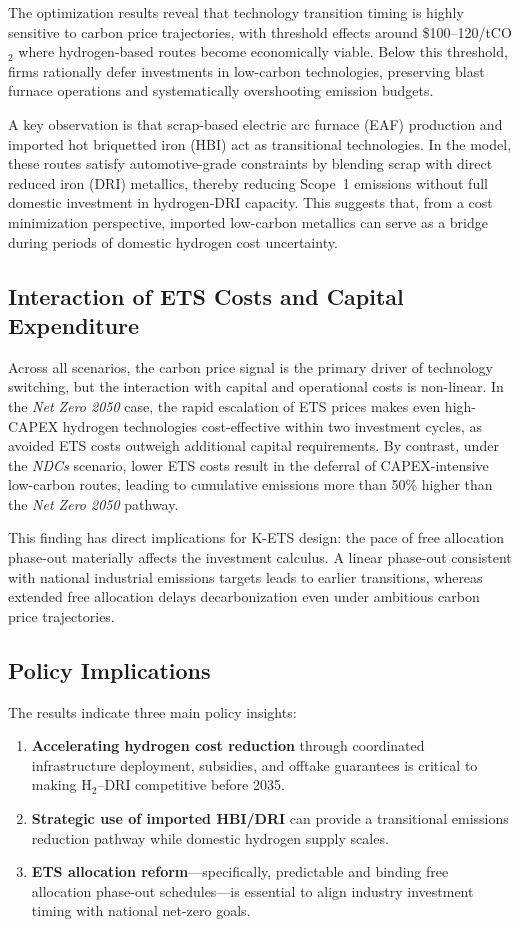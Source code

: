 \documentclass[preprint,5p,authoryear]{elsarticle}
\begin{document}
The optimization results reveal that technology transition timing is highly sensitive to carbon price trajectories, with threshold effects around \$100--120/tCO$_2$ where hydrogen-based routes become economically viable. Below this threshold, firms rationally defer investments in low-carbon technologies, preserving blast furnace operations and systematically overshooting emission budgets.

A key observation is that scrap-based electric arc furnace (EAF) production and imported hot briquetted iron (HBI) act as transitional technologies. In the model, these routes satisfy automotive-grade constraints by blending scrap with direct reduced iron (DRI) metallics, thereby reducing Scope~1 emissions without full domestic investment in hydrogen-DRI capacity. This suggests that, from a cost minimization perspective, imported low-carbon metallics can serve as a bridge during periods of domestic hydrogen cost uncertainty.

\subsection{Interaction of ETS Costs and Capital Expenditure}
Across all scenarios, the carbon price signal is the primary driver of technology switching, but the interaction with capital and operational costs is non-linear. In the \textit{Net Zero 2050} case, the rapid escalation of ETS prices makes even high-CAPEX hydrogen technologies cost-effective within two investment cycles, as avoided ETS costs outweigh additional capital requirements. By contrast, under the \textit{NDCs} scenario, lower ETS costs result in the deferral of CAPEX-intensive low-carbon routes, leading to cumulative emissions more than 50\% higher than the \textit{Net Zero 2050} pathway.

This finding has direct implications for K-ETS design: the pace of free allocation phase-out materially affects the investment calculus. A linear phase-out consistent with national industrial emissions targets leads to earlier transitions, whereas extended free allocation delays decarbonization even under ambitious carbon price trajectories.

\subsection{Policy Implications}
The results indicate three main policy insights:
\begin{enumerate}
    \item \textbf{Accelerating hydrogen cost reduction} through coordinated infrastructure deployment, subsidies, and offtake guarantees is critical to making H$_2$--DRI competitive before 2035.
    \item \textbf{Strategic use of imported HBI/DRI} can provide a transitional emissions reduction pathway while domestic hydrogen supply scales.
    \item \textbf{ETS allocation reform}---specifically, predictable and binding free allocation phase-out schedules---is essential to align industry investment timing with national net-zero goals.
\end{enumerate}
\end{document}
